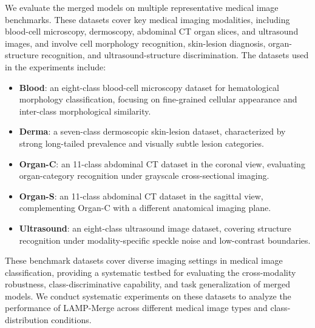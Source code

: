 \documentclass[letterpaper]{article} %
\begin{document}
We evaluate the merged models on multiple representative medical image benchmarks. These datasets cover key medical imaging modalities, including blood-cell microscopy, dermoscopy, abdominal CT organ slices, and ultrasound images, and involve cell morphology recognition, skin-lesion diagnosis, organ-structure recognition, and ultrasound-structure discrimination. The datasets used in the experiments include:

\begin{itemize}
\item \textbf{Blood}: an eight-class blood-cell microscopy dataset for hematological morphology classification, focusing on fine-grained cellular appearance and inter-class morphological similarity.
\item \textbf{Derma}: a seven-class dermoscopic skin-lesion dataset, characterized by strong long-tailed prevalence and visually subtle lesion categories.
\item \textbf{Organ-C}: an 11-class abdominal CT dataset in the coronal view, evaluating organ-category recognition under grayscale cross-sectional imaging.
\item \textbf{Organ-S}: an 11-class abdominal CT dataset in the sagittal view, complementing Organ-C with a different anatomical imaging plane.
\item \textbf{Ultrasound}: an eight-class ultrasound image dataset, covering structure recognition under modality-specific speckle noise and low-contrast boundaries.
\end{itemize}

These benchmark datasets cover diverse imaging settings in medical image classification, providing a systematic testbed for evaluating the cross-modality robustness, class-discriminative capability, and task generalization of merged models. We conduct systematic experiments on these datasets to analyze the performance of LAMP-Merge across different medical image types and class-distribution conditions.
\end{document}
